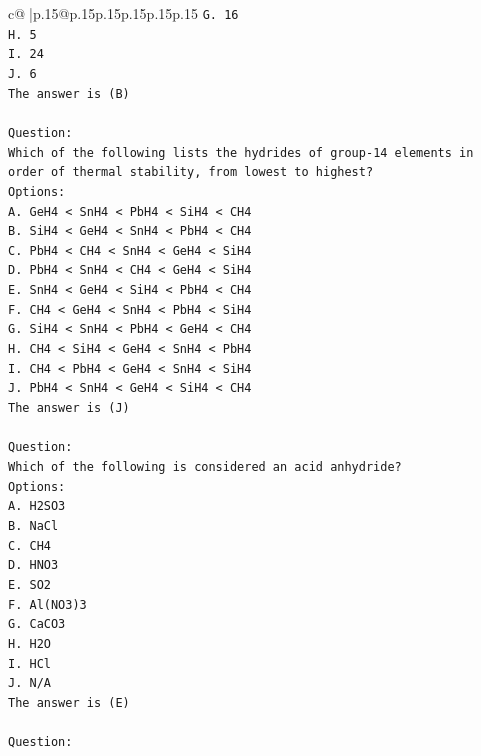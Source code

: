 \documentclass{article}
\begin{document}
{\begin{supertabular}{c@{$\;$}|p{.15\linewidth}@{}p{.15\linewidth}p{.15\linewidth}p{.15\linewidth}p{.15\linewidth}p{.15\linewidth}}
{{{\texttt{G. 16} \\
\texttt{H. 5} \\
\texttt{I. 24} \\
\texttt{J. 6} \\
\texttt{The answer is (B)} \\
\\ 
\texttt{Question:} \\
\texttt{Which of the following lists the hydrides of group{-}14 elements in order of thermal stability, from lowest to highest?} \\
\texttt{Options:} \\
\texttt{A. GeH4 < SnH4 < PbH4 < SiH4 < CH4} \\
\texttt{B. SiH4 < GeH4 < SnH4 < PbH4 < CH4} \\
\texttt{C. PbH4 < CH4 < SnH4 < GeH4 < SiH4} \\
\texttt{D. PbH4 < SnH4 < CH4 < GeH4 < SiH4} \\
\texttt{E. SnH4 < GeH4 < SiH4 < PbH4 < CH4} \\
\texttt{F. CH4 < GeH4 < SnH4 < PbH4 < SiH4} \\
\texttt{G. SiH4 < SnH4 < PbH4 < GeH4 < CH4} \\
\texttt{H. CH4 < SiH4 < GeH4 < SnH4 < PbH4} \\
\texttt{I. CH4 < PbH4 < GeH4 < SnH4 < SiH4} \\
\texttt{J. PbH4 < SnH4 < GeH4 < SiH4 < CH4} \\
\texttt{The answer is (J)} \\
\\ 
\texttt{Question:} \\
\texttt{Which of the following is considered an acid anhydride?} \\
\texttt{Options:} \\
\texttt{A. H2SO3} \\
\texttt{B. NaCl} \\
\texttt{C. CH4} \\
\texttt{D. HNO3} \\
\texttt{E. SO2} \\
\texttt{F. Al(NO3)3} \\
\texttt{G. CaCO3} \\
\texttt{H. H2O} \\
\texttt{I. HCl} \\
\texttt{J. N/A} \\
\texttt{The answer is (E)} \\
\\ 
\texttt{Question:} \\
}}}
\end{supertabular}}
\end{document}
